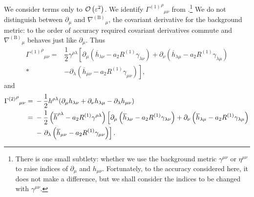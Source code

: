 We consider terms only to $\mathcal{O}\left({\varepsilon^2}\right)$. We identify ${{\Gamma^{(1)}}^\rho}_{\mu\nu}$ from .\footnote{There is one small subtlety: whether we use the background metric $\gamma^{\mu\nu}$ or $\eta^{\mu\nu}$ to raise indices of $\partial_\mu$ and $h_{\mu\nu}$. Fortunately, to the accuracy considered here, it does not make a difference, but we shall consider the indices to be changed with $\gamma^{\mu\nu}$.} We do not distinguish between $\partial_\mu$ and ${\nabla^{(\text{B})}}_\mu$, the covariant derivative for the background metric: to the order of accuracy required covariant derivatives commute and ${\nabla^{(\text{B})}}_\mu$ behaves just like $\partial_\mu$. Thus
\begin{align}
{{\Gamma^{(1)}}^\rho}_{\mu\nu} = {} & \dfrac{1}{2}\gamma^{\rho\lambda}\left[\partial_\mu \left(\overline{h}_{\lambda\nu} - a_2 R^{(1)}\gamma_{\lambda\nu}\right) + \partial_\nu \left(\overline{h}_{\lambda\mu} - a_2 R^{(1)}\gamma_{\lambda\mu}\right) \right. \nonumber \\*
 & - \left. \partial_\lambda \left(\overline{h}_{\mu\nu} - a_2 R^{(1)}\gamma_{\mu\nu}\right)\right] ,
\end{align}
and
\begin{align}
{{\Gamma^{(2)}}^\rho}_{\mu\nu} = {} & -\dfrac{1}{2}h^{\rho\lambda}(\partial_\mu h_{\lambda\nu} + \partial_\nu h_{\lambda\mu} - \partial_\lambda h_{\mu\nu}) \nonumber \\*
 = {} & -\dfrac{1}{2}\left(\overline{h}^{\rho\lambda} - a_2 R^{(1)}\gamma^{\rho\lambda}\right)\left[\partial_\mu \left(\overline{h}_{\lambda\nu} - a_2 R^{(1)}\gamma_{\lambda\nu}\right) + \partial_\nu \left(\overline{h}_{\lambda\mu} - a_2 R^{(1)}\gamma_{\lambda\mu}\right) \right. \nonumber \\*
 & - \left. \partial_\lambda \left(\overline{h}_{\mu\nu} \vphantom{R^{(1)}} - a_2 R^{(1)}\gamma_{\mu\nu}\right)\right].
\end{align}

